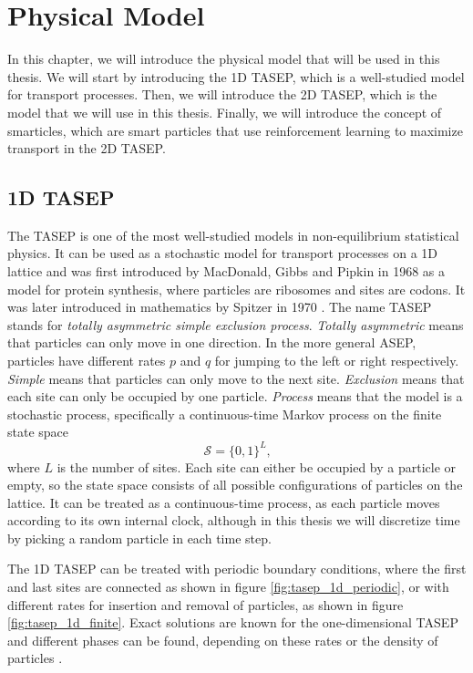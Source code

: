 \graphicspath{{img/model/out}{img/model}}

\chapter{Physical Model}
In this chapter, we will introduce the physical model that will be used in this thesis. We will start by introducing the 1D TASEP, which is a well-studied model for transport processes. Then, we will introduce the 2D TASEP, which is the model that we will use in this thesis. Finally, we will introduce the concept of smarticles, which are smart particles that use reinforcement learning to maximize transport in the 2D TASEP.

\section{1D TASEP}
\label{sec:1d-tasep}
The TASEP is one of the most well-studied models in non-equilibrium statistical physics. It can be used as a stochastic model for transport processes on a 1D lattice and was first introduced by MacDonald, Gibbs and Pipkin in 1968 \cite{macdonald_kinetics_1968} as a model for protein synthesis, where particles are ribosomes and sites are codons. It was later introduced in mathematics by Spitzer in 1970 \cite{spitzer_interaction_1970}. The name TASEP stands for \textit{totally asymmetric simple exclusion process}. \textit{Totally asymmetric} means that particles can only move in one direction. In the more general ASEP, particles have different rates $p$ and $q$ for jumping to the left or right respectively. \textit{Simple} means that particles can only move to the next site. \textit{Exclusion} means that each site can only be occupied by one particle. \textit{Process} means that the model is a stochastic process, specifically a continuous-time Markov process on the finite state space
\begin{equation}
    \mathcal{S} = \{0, 1\}^L \text{,}
    \label{eq:state-space}
\end{equation}
where $L$ is the number of sites. Each site can either be occupied by a particle or empty, so the state space consists of all possible configurations of particles on the lattice. It can be treated as a continuous-time process, as each particle moves according to its own internal clock, although in this thesis we will discretize time by picking a random particle in each time step.


The 1D TASEP can be treated with periodic boundary conditions, where the first and last sites are connected as shown in figure \ref{fig:tasep_1d_periodic}, or with different rates for insertion and removal of particles, as shown in figure \ref{fig:tasep_1d_finite}. Exact solutions are known for the one-dimensional TASEP and different phases can be found, depending on these rates or the density of particles \cite{schutz_exact_1997,blythe_nonequilibrium_2007}.

